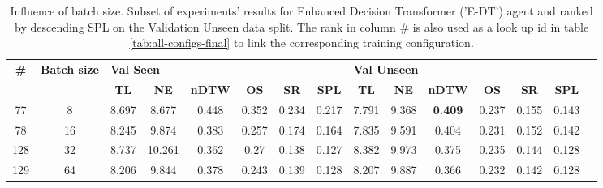 \begin{table}
\centering
\caption{\label{tab:e_dt_batch_test}Influence of batch size. Subset of experiments' results for Enhanced Decision Transformer ('E-DT') agent and ranked by descending SPL on the Validation Unseen data split. The rank in column \# is also used as a look up id in table \ref{tab:all-configs-final} to link the corresponding training configuration.}
\begin{tabular}{@{\hskip3pt}c@{\hskip3pt}c@{\hskip3pt}c@{\hskip3pt}c@{\hskip3pt}c@{\hskip3pt}c@{\hskip3pt}c@{\hskip3pt}c@{\hskip3pt}c@{\hskip3pt}c@{\hskip3pt}c@{\hskip3pt}c@{\hskip3pt}c@{\hskip3pt}c@{\hskip3pt}c}
\toprule
\textbf{\#} & \textbf{Batch size} & \multicolumn{6}{l}{\textbf{Val Seen}} & \multicolumn{6}{l}{\textbf{Val Unseen}} \\
 \textbf{~} &          \textbf{~} &       \textbf{TL} & \textbf{NE} & \textbf{nDTW} & \textbf{OS} & \textbf{SR} & \textbf{SPL} &         \textbf{TL} & \textbf{NE} &   \textbf{nDTW} & \textbf{OS} & \textbf{SR} & \textbf{SPL} \\
\midrule
         77 &                   8 &             8.697 &       8.677 &         0.448 &       0.352 &       0.234 &        0.217 &               7.791 &       9.368 &  \textbf{0.409} &       0.237 &       0.155 &        0.143 \\
         78 &                  16 &             8.245 &       9.874 &         0.383 &       0.257 &       0.174 &        0.164 &               7.835 &       9.591 &           0.404 &       0.231 &       0.152 &        0.142 \\
        128 &                  32 &             8.737 &      10.261 &         0.362 &        0.27 &       0.138 &        0.127 &               8.382 &       9.973 &           0.375 &       0.235 &       0.144 &        0.128 \\
        129 &                  64 &             8.206 &       9.844 &         0.378 &       0.243 &       0.139 &        0.128 &               8.207 &       9.887 &           0.366 &       0.232 &       0.142 &        0.128 \\
\bottomrule
\end{tabular}
\end{table}
